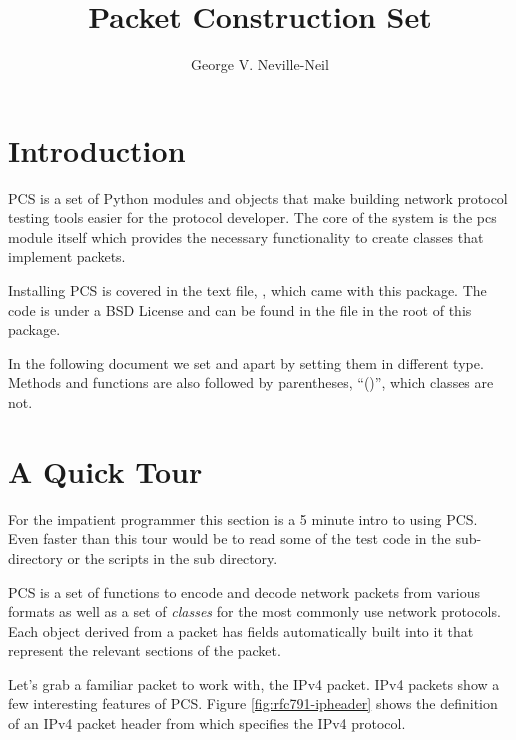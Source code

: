 \documentclass[11pt]{article}
\title{Packet Construction Set}
\author{George V. Neville-Neil}
\begin{document}
\maketitle
\tableofcontents
\section{Introduction}

PCS is a set of Python modules and objects that make building network
protocol testing tools easier for the protocol developer.  The core of
the system is the pcs module itself which provides the necessary
functionality to create classes that implement packets.

Installing PCS is covered in the text file, , which came
with this package.  The code is under a BSD License and can be found
in the file  in the root of this package.

In the following document we set  
 and  apart by setting them in
different type.  Methods and functions are also followed by
parentheses, ``()'', which classes are not.


\section{A Quick Tour}

For the impatient programmer this section is a 5 minute intro to using
PCS.  Even faster than this tour would be to read some of the test
code in the  sub-directory or the scripts in the
 sub directory.

PCS is a set of functions to encode and decode network packets from
various formats as well as a set of \emph{classes} for the most
commonly use network protocols.  Each object derived from a packet has
fields automatically built into it that represent the relevant
sections of the packet.  

Let's grab a familiar packet to work with, the IPv4 packet.  IPv4
packets show a few interesting features of PCS.  Figure
\ref{fig:rfc791-ipheader} shows the definition of an IPv4 packet
header from \cite{rfc791} which specifies the IPv4 protocol.  
\end{document}
